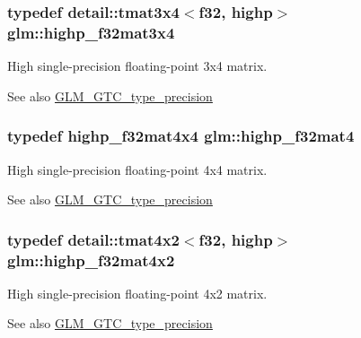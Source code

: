 \subsubsection[{\texorpdfstring{highp\+\_\+f32mat3x4}{highp_f32mat3x4}}]{\setlength{\rightskip}{0pt plus 5cm}typedef detail\+::tmat3x4$<$f32, highp$>$ {\bf glm\+::highp\+\_\+f32mat3x4}}\hypertarget{group__gtc__type__precision_gaa71f504ecb02f9178026b01013b77ba0}{}\label{group__gtc__type__precision_gaa71f504ecb02f9178026b01013b77ba0}
High single-\/precision floating-\/point 3x4 matrix. \begin{DoxySeeAlso}{See also}
\hyperlink{group__gtc__type__precision}{G\+L\+M\+\_\+\+G\+T\+C\+\_\+type\+\_\+precision} 
\end{DoxySeeAlso}
\subsubsection[{\texorpdfstring{highp\+\_\+f32mat4}{highp_f32mat4}}]{\setlength{\rightskip}{0pt plus 5cm}typedef highp\+\_\+f32mat4x4 {\bf glm\+::highp\+\_\+f32mat4}}\hypertarget{group__gtc__type__precision_gac14c1bfb647e39d459c7489ede2156cc}{}\label{group__gtc__type__precision_gac14c1bfb647e39d459c7489ede2156cc}
High single-\/precision floating-\/point 4x4 matrix. \begin{DoxySeeAlso}{See also}
\hyperlink{group__gtc__type__precision}{G\+L\+M\+\_\+\+G\+T\+C\+\_\+type\+\_\+precision} 
\end{DoxySeeAlso}
\subsubsection[{\texorpdfstring{highp\+\_\+f32mat4x2}{highp_f32mat4x2}}]{\setlength{\rightskip}{0pt plus 5cm}typedef detail\+::tmat4x2$<$f32, highp$>$ {\bf glm\+::highp\+\_\+f32mat4x2}}\hypertarget{group__gtc__type__precision_ga4d799497b303c2434fe709f81f6bd4dd}{}\label{group__gtc__type__precision_ga4d799497b303c2434fe709f81f6bd4dd}
High single-\/precision floating-\/point 4x2 matrix. \begin{DoxySeeAlso}{See also}
\hyperlink{group__gtc__type__precision}{G\+L\+M\+\_\+\+G\+T\+C\+\_\+type\+\_\+precision} 
\end{DoxySeeAlso}
